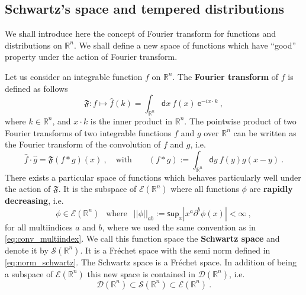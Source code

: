 \documentclass[11pt]{book}
\renewcommand{\sup}{\mathsf{sup}}
\newcommand{\abs}[1]{\left|#1\right|}
\newcommand{\norm}[1]{\left|\left|#1\right|\right|}
\newcommand{\Dcal}{\mathcal{D}}
\newcommand{\Ecal}{\mathcal{E}}
\newcommand{\Scal}{\mathcal{S}}
\newcommand{\Rbb}{\mathbb{R}}
\newcommand{\Frak}{\mathfrak{F}}
\newcommand{\dsf}{\mathsf{d}}
\newcommand{\esf}{\mathsf{e}}
\theoremstyle{break}
\begin{document}
\subsection{Schwartz's space and tempered distributions}
\label{p:FOURIER}


We shall introduce here the concept of Fourier transform for functions and distributions on $\Rbb^n$. We shall define a new space of functions which have ``good'' property under the action of Fourier transform.


\bigskip


Let us consider an integrable function $f$ on $\Rbb^n$. The \textbf{Fourier transform} of $f$ is defined as follows
%
\begin{equation*}
\Frak : f \mapsto  \hat{f}(k) = \int_{\Rbb^n} \dsf x \ f(x) \ \esf^{-i x \cdot k} \ , 
\end{equation*}
%
where $k \in \Rbb^n$, and $x \cdot k$ is the inner product in $\Rbb^n$. The pointwise product of two Fourier transforms of two integrable functions $f$ and $g$ over $\Rbb^n$ can be written as the Fourier transform of the convolution of $f$ and $g$, i.e.
%
\begin{equation*}
\hat{f} \cdot \hat{g} = \Frak( f \ast g )(x) \ , \quad \mbox{with} \qquad (f \ast g) := \int_{\Rbb^n} \dsf y \ f(y) g(x-y) \ . 
\end{equation*}
%
There exists a particular space of functions which behaves particularly well under the action of $\Frak$. It is the subspace of $\Ecal(\Rbb^n)$ where all functions $\phi$ are \textbf{rapidly decreasing}, i.e.
%
\begin{equation}
\phi \in \Ecal(\Rbb^n) \ \ \mbox{ where } \ \ \norm{\phi}_{a b} := \sup_x \abs{x^a \partial^b \phi(x)} < \infty \ ,
\label{eq:norm_schwartz}
\end{equation}
%
for all multiindices $a$ and $b$, where we used the same convention as in \eqref{eq:conv_multiindex}. We call this function space the \textbf{Schwartz space} and denote it by $\Scal(\Rbb^n)$. It is a Fréchet space with the semi norm defined in \eqref{eq:norm_schwartz}. The Schwartz space is a Fréchet space. In addition of being a subspace of $\Ecal(\Rbb^n)$ this new space is contained in $\Dcal(\Rbb^n)$, i.e.
%
\begin{equation*}
\Dcal(\Rbb^n) \subset \Scal(\Rbb^n) \subset \Ecal(\Rbb^n) \ .
\end{equation*}
\end{document}
